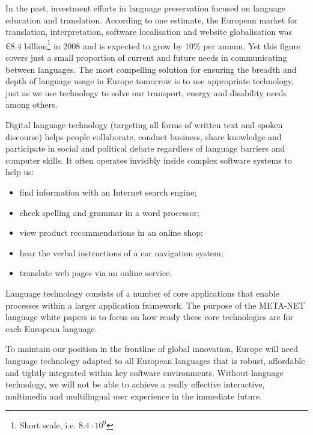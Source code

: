 In the past, investment efforts in language preservation focused on language education and translation. According to one estimate, the European market for translation, interpretation, software localisation and website globalisation was \euro8.4 billion\footnote{Short scale, i.e. $8.4\cdot 10^9$} in 2008 and is expected to grow by 10\% per annum. Yet this figure covers just a small proportion of current and future needs in communicating between languages. The most compelling solution for ensuring the breadth and depth of language usage in Europe tomorrow is to use appropriate technology, just as we use technology to solve our transport, energy and disability needs among others.

Digital language technology (targeting all forms of written text and spoken discourse) helps people collaborate, conduct business, share knowledge and participate in social and political debate regardless of language barriers and computer skills. It often operates invisibly inside complex software systems to help us:

\begin{itemize}
\item find information with an Internet search engine;
\item check spelling and grammar in a word processor;
\item view product recommendations in an online shop;
\item hear the verbal instructions of a car navigation system;
\item translate web pages via an online service.
\end{itemize}

Language technology consists of a number of core applications that enable processes within a larger application framework. The purpose of the META-NET language white papers is to focus on how ready these core technologies are for each European language. 

To maintain our position in the frontline of global innovation, Europe will need language technology adapted to all European languages that is robust, affordable and tightly integrated within key software environments. Without language technology, we will not be able to achieve a really effective interactive, multimedia and multilingual user experience in the immediate future. 
